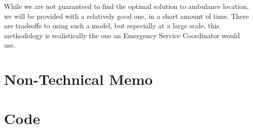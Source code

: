 \documentclass[notitlepage, 12pt]{article}
\begin{document}
While we are not guaranteed to find the optimal solution to ambulance location, we will be provided with a relatively good one, in a short amount of time. There are tradeoffs to using such a model, but especially at a large scale, this methodology is realistically the one an Emergency Service Coordinator would use.

\section{Non-Technical Memo}

\appendix
\section{Code}







\end{document}
